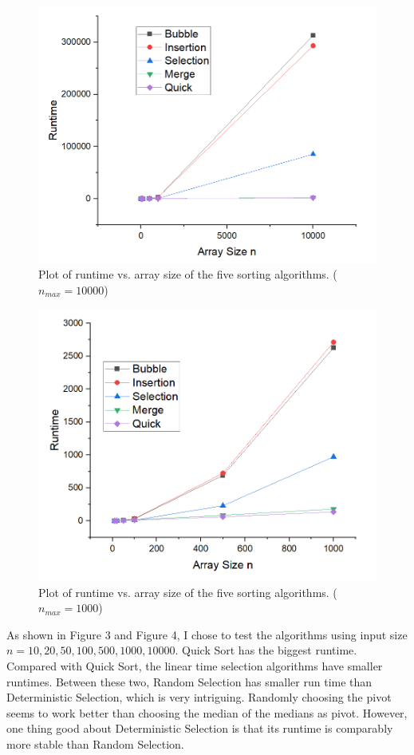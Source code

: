 \documentclass[a4paper]{article}
\begin{document}
\begin{figure}[htbp]
\centering
\includegraphics[scale=0.6]{f3.png}
\caption{Plot of runtime vs. array size of the five sorting algorithms. ($n_{max}=10000$)}
\end{figure}
\begin{figure}[htbp]
\centering
\includegraphics[scale=0.6]{f1.png}
\caption{Plot of runtime vs. array size of the five sorting algorithms. ($n_{max}=1000$)}
\end{figure}

\par
As shown in Figure 3 and Figure 4, I chose to test the algorithms using input size $n=10,20,50,100,500,1000,10000$. Quick Sort has the biggest runtime. Compared with Quick Sort, the linear time selection algorithms have smaller runtimes. Between these two, Random Selection has smaller run time than Deterministic Selection, which is very intriguing. Randomly choosing the pivot seems to work better than choosing the median of the medians as pivot. However, one thing good about Deterministic Selection is that its runtime is comparably more stable than Random Selection.
\end{document}
